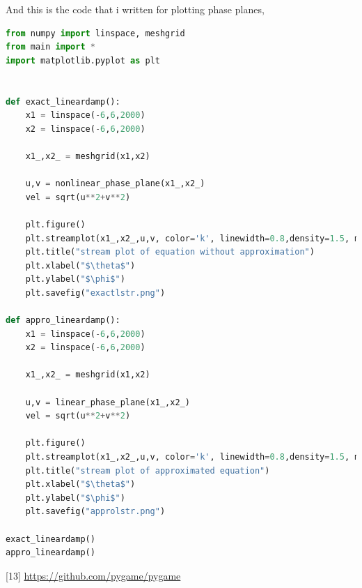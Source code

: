 \documentclass{article}
\begin{document}
And this is the code that i written for plotting phase planes,
\begin{lstlisting}[language=Python]
    from numpy import linspace, meshgrid
from main import *
import matplotlib.pyplot as plt


def exact_lineardamp():
    x1 = linspace(-6,6,2000)
    x2 = linspace(-6,6,2000)

    x1_,x2_ = meshgrid(x1,x2)

    u,v = nonlinear_phase_plane(x1_,x2_)
    vel = sqrt(u**2+v**2)

    plt.figure()
    plt.streamplot(x1_,x2_,u,v, color='k', linewidth=0.8,density=1.5, minlength=0.01, arrowsize=0.8,arrowstyle="->")
    plt.title("stream plot of equation without approximation")
    plt.xlabel("$\theta$")
    plt.ylabel("$\phi$")
    plt.savefig("exactlstr.png")

def appro_lineardamp():
    x1 = linspace(-6,6,2000)
    x2 = linspace(-6,6,2000)

    x1_,x2_ = meshgrid(x1,x2)

    u,v = linear_phase_plane(x1_,x2_)
    vel = sqrt(u**2+v**2)

    plt.figure()
    plt.streamplot(x1_,x2_,u,v, color='k', linewidth=0.8,density=1.5, minlength=0.01, arrowsize=0.8,arrowstyle="->")
    plt.title("stream plot of approximated equation")
    plt.xlabel("$\theta$")
    plt.ylabel("$\phi$")
    plt.savefig("approlstr.png")

exact_lineardamp()
appro_lineardamp()

  \end{lstlisting}






[13] \url{https://github.com/pygame/pygame}
\end{document}
